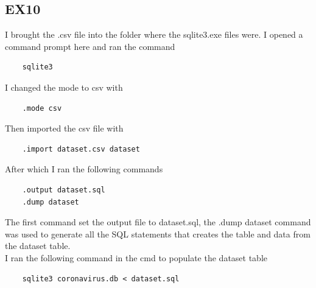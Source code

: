 \documentclass[]{article}
\begin{document}
\subsection{EX10}
I brought the .csv file into the folder where the sqlite3.exe files were. I opened a command prompt here and ran the command
\begin{verbatim}
    sqlite3
\end{verbatim}
I changed the mode to csv with
\begin{verbatim}
    .mode csv
\end{verbatim}
Then imported the csv file with
\begin{verbatim}
    .import dataset.csv dataset
\end{verbatim}
After which I ran the following commands
\begin{verbatim}
    .output dataset.sql
    .dump dataset
\end{verbatim}
The first command set the output file to dataset.sql, the .dump dataset command was used to generate all the SQL statements that creates the table and data from the dataset table.\\
I ran the following command in the cmd to populate the dataset table
\begin{verbatim}
    sqlite3 coronavirus.db < dataset.sql
\end{verbatim}
\end{document}
